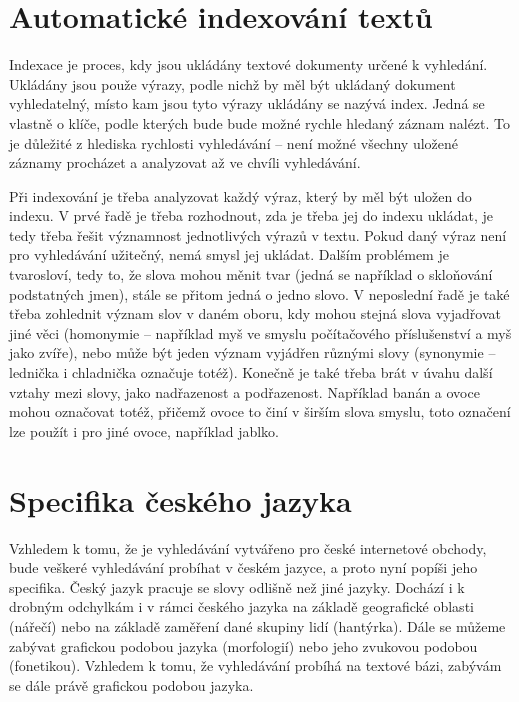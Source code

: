 \documentclass[FM,DP]{tulthesis}
\begin{document}
\section{Automatické indexování textů}

Indexace je proces, kdy jsou ukládány textové dokumenty určené k vyhledání.
Ukládány jsou použe výrazy, podle nichž by měl být ukládaný dokument vyhledatelný, 
místo kam jsou tyto výrazy ukládány se nazývá index. Jedná se vlastně o klíče, 
podle kterých bude bude možné rychle hledaný záznam nalézt. To je důležité z hlediska
rychlosti vyhledávání -- není možné všechny uložené záznamy procházet a analyzovat
až ve chvíli vyhledávání. 

Při indexování je třeba analyzovat každý výraz, který by měl být uložen do indexu.
V prvé řadě je třeba rozhodnout, zda je třeba jej do indexu ukládat, je tedy 
třeba řešit významnost jednotlivých výrazů v textu. Pokud daný
výraz není pro vyhledávání užitečný, nemá smysl jej ukládat. Dalším problémem je 
tvarosloví, tedy to, že slova mohou měnit tvar (jedná se například o skloňování 
podstatných jmen), stále se přitom jedná o jedno slovo. V neposlední řadě je také 
třeba zohlednit význam slov v daném oboru, kdy mohou stejná slova vyjadřovat jiné věci 
(homonymie -- například myš ve smyslu počítačového příslušenství a myš jako zvíře), 
nebo může být jeden význam vyjádřen různými slovy (synonymie -- lednička i chladnička 
označuje totéž). Konečně je také třeba brát v úvahu další vztahy mezi slovy, 
jako nadřazenost a podřazenost. Například banán a ovoce mohou označovat totéž, 
přičemž ovoce to činí v širším slova smyslu, toto označení lze použít i pro jiné 
ovoce, například jablko.

\section{Specifika českého jazyka}

Vzhledem k tomu, že je vyhledávání vytvářeno pro české internetové obchody, 
bude veškeré vyhledávání probíhat v českém jazyce, a proto nyní popíši jeho specifika.
Český jazyk pracuje se slovy odlišně než jiné jazyky. Dochází i k drobným
odchylkám i v rámci českého jazyka na základě geografické oblasti (nářečí)
nebo na základě zaměření dané skupiny lidí (hantýrka). Dále se můžeme zabývat
grafickou podobou jazyka (morfologií) nebo jeho zvukovou podobou (fonetikou).
Vzhledem k tomu, že vyhledávání probíhá na textové bázi, zabývám se dále právě 
grafickou podobou jazyka.
\end{document}
